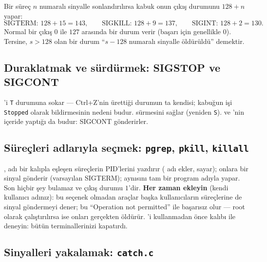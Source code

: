 \begin{keyidea}
Bir süreç $n$ numaralı sinyalle sonlandırılırsa kabuk onun çıkış durumunu $128 + n$ yapar:
\[
\text{SIGTERM: } 128 + 15 = 143, \qquad \text{SIGKILL: } 128 + 9 = 137, \qquad \text{SIGINT: } 128 + 2 = 130 .
\]
Normal bir çıkış $0$ ile $127$ arasında bir durum verir (başarı için genellikle $0$). Tersine, $s > 128$ olan bir durum ``$s - 128$ numaralı sinyalle öldürüldü'' demektir.
\end{keyidea}

\subsection{Duraklatmak ve sürdürmek: SIGSTOP ve SIGCONT}



 'i \texttt{T} durumuna sokar --- Ctrl+Z'nin ürettiği durumun ta kendisi; kabuğun işi \texttt{Stopped} olarak bildirmesinin nedeni budur.  sürmesini sağlar (yeniden \texttt{S}).  ve 'nin içeride yaptığı da budur: SIGCONT gönderirler.

\subsection{Süreçleri adlarıyla seçmek: \texttt{pgrep}, \texttt{pkill}, \texttt{killall}}
\label{sec:pkill}



, adı bir kalıpla eşleşen süreçlerin PID'lerini yazdırır ( adı ekler,  sayar);  onlara bir sinyal gönderir (varsayılan SIGTERM);  aynısını tam bir program adıyla yapar. Son  hiçbir şey bulamaz ve çıkış durumu $1$'dir. \textbf{Her zaman  ekleyin} (kendi kullanıcı adınız): bu seçenek olmadan araçlar başka kullanıcıların süreçlerine de sinyal göndermeyi dener; bu ``Operation not permitted'' ile başarısız olur --- root olarak çalıştırılırsa ise onları gerçekten öldürür. 'i kullanmadan önce kalıbı  ile deneyin:  bütün terminallerinizi kapatırdı.

\subsection{Sinyalleri yakalamak: \texttt{catch.c}}

